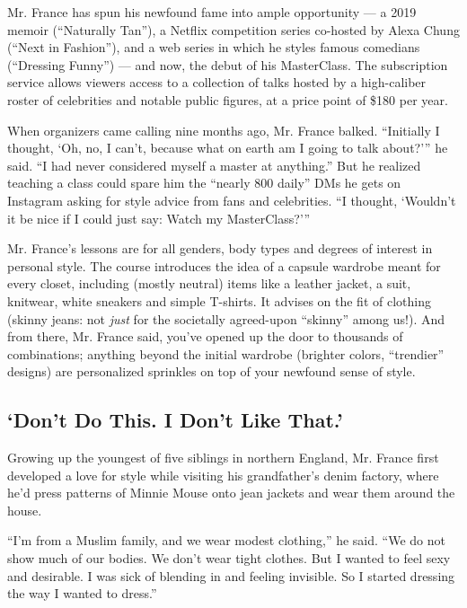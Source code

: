 Mr. France has spun his newfound fame into ample opportunity --- a 2019
memoir (``Naturally Tan''), a Netflix competition series co-hosted by
Alexa Chung (``Next in Fashion''), and a web series in which he styles
famous comedians (``Dressing Funny'') --- and now, the debut of his
MasterClass. The subscription service allows viewers access to a
collection of talks hosted by a high-caliber roster of celebrities and
notable public figures, at a price point of \$180 per year.

When organizers came calling nine months ago, Mr. France balked.
``Initially I thought, `Oh, no, I can't, because what on earth am I
going to talk about?''' he said. ``I had never considered myself a
master at anything.'' But he realized teaching a class could spare him
the ``nearly 800 daily'' DMs he gets on Instagram asking for style
advice from fans and celebrities. ``I thought, `Wouldn't it be nice if I
could just say: Watch my MasterClass?'''

Mr. France's lessons are for all genders, body types and degrees of
interest in personal style. The course introduces the idea of a capsule
wardrobe meant for every closet, including (mostly neutral) items like a
leather jacket, a suit, knitwear, white sneakers and simple T-shirts. It
advises on the fit of clothing (skinny jeans: not \emph{just} for the
societally agreed-upon ``skinny'' among us!). And from there, Mr. France
said, you've opened up the door to thousands of combinations; anything
beyond the initial wardrobe (brighter colors, ``trendier'' designs) are
personalized sprinkles on top of your newfound sense of style.

\hypertarget{dont-do-this-i-dont-like-that}{%
\subsection{`Don't Do This. I Don't Like
That.'}\label{dont-do-this-i-dont-like-that}}

Growing up the youngest of five siblings in northern England, Mr. France
first developed a love for style while visiting his grandfather's denim
factory, where he'd press patterns of Minnie Mouse onto jean jackets and
wear them around the house.

``I'm from a Muslim family, and we wear modest clothing,'' he said. ``We
do not show much of our bodies. We don't wear tight clothes. But I
wanted to feel sexy and desirable. I was sick of blending in and feeling
invisible. So I started dressing the way I wanted to dress.''

